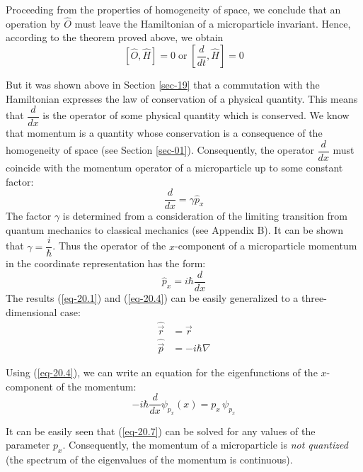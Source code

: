 \documentclass[a4paper,sfsidenotes,colorlinks=true]{tufte-book}
\numberwithin{equation}{section}
\numberwithin{figure}{section}
\begin{document}
Proceeding from the properties of homogeneity of space, we conclude
that an operation by $\hat{O}$ must leave the Hamiltonian of a microparticle
invariant. Hence, according to the theorem proved above, we obtain 
\begin{equation*}
\left[ \hat{O}, \hat{H} \right] = 0 \; \mathrm{or} \; \left[ \frac{d}{dt}, \hat{H} \right] = 0
\end{equation*}

But it was shown above in Section \ref{sec-19} that a commutation with
the Hamiltonian expresses the law of conservation of a physical
quantity. This means that $\dfrac{d}{dx}$ is the operator of some
physical quantity which is conserved. We know that momentum is a
quantity whose conservation is a consequence of the homogeneity of
space (see Section \ref{sec-01}). Consequently, the operator
$\dfrac{d}{dx}$ must coincide with the momentum operator of a
microparticle up to some constant factor:
\begin{equation}%
\frac{d}{dx} = \gamma \hat{p}_{x}
\label{eq-20.3}
\end{equation}
The factor $\gamma$ is determined from a consideration
of the limiting transition from quantum mechanics to classical
mechanics (see Appendix B). It can be shown that $\gamma = \dfrac{i}{\hbar}$. Thus the
operator of the $x$-component of a microparticle momentum in the
coordinate representation has the form:
\begin{equation}%
\hat{p}_{x} = i \hbar \frac{d}{dx} 
\label{eq-20.4}
\end{equation}
The results (\ref{eq-20.1}) and (\ref{eq-20.4}) can be easily generalized to a
three-dimensional case:
\begin{align}%
\hat{\vec{r}} &= \vec{r}\\
\label{eq-20.5}
\hat{\vec{p}} &= - i \hbar \nabla
\label{eq-20.6}
\end{align}


Using (\ref{eq-20.4}), we can write an
equation for the eigenfunctions of the $x$-component of the momentum:
\begin{equation}%
-i \hbar \frac{d}{dx} \psi_{p_{x}} (x) = p_{x} \, \psi_{p_{x}}
\label{eq-20.7}
\end{equation}

It can be easily seen that (\ref{eq-20.7}) can be solved for any values of the
parameter $p_{x}$. Consequently, the momentum of a microparticle is \emph{not
quantized} (the spectrum of the eigenvalues of the momentum is
continuous).
\end{document}

